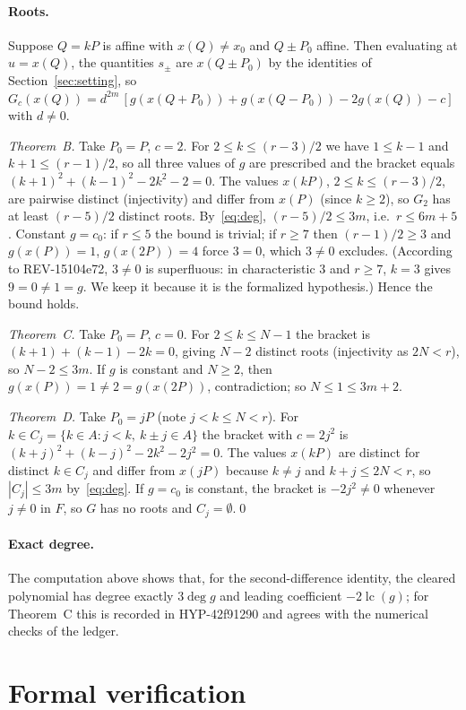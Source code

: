 \documentclass[11pt,a4paper]{article}
\theoremstyle{remark}
\newcommand{\lc}{\operatorname{lc}}
\begin{document}
\paragraph{Roots.} Suppose $Q=kP$ is affine with $x(Q)\ne x_0$ and $Q\pm P_0$ affine. Then evaluating at $u=x(Q)$,
the quantities $s_\pm$ are $x(Q\pm P_0)$ by the identities of Section~\ref{sec:setting}, so
$G_c(x(Q))=d^{2m}\,[g(x(Q+P_0))+g(x(Q-P_0))-2g(x(Q))-c]$ with $d\ne0$.

\emph{Theorem~B.} Take $P_0=P$, $c=2$. For $2\le k\le (r-3)/2$ we have $1\le k-1$ and $k+1\le(r-1)/2$, so all three values of $g$ are
prescribed and the bracket equals $(k+1)^2+(k-1)^2-2k^2-2=0$. The values $x(kP)$, $2\le k\le (r-3)/2$, are pairwise distinct (injectivity) and
differ from $x(P)$ (since $k\ge2$), so $G_2$ has at least $(r-5)/2$ distinct roots. By~\eqref{eq:deg}, $(r-5)/2\le3m$, i.e.\ $r\le6m+5$.
Constant $g=c_0$: if $r\le5$ the bound is trivial; if $r\ge7$ then $(r-1)/2\ge3$ and $g(x(P))=1$, $g(x(2P))=4$ force $3=0$, which $3\ne0$ excludes. (According to \mbox{REV-15104e72}, $3\ne0$ is superfluous: in characteristic $3$ and $r\ge7$, $k=3$ gives $9=0\ne1=g$. We keep it because it is the formalized hypothesis.) Hence the bound holds.

\emph{Theorem~C.} Take $P_0=P$, $c=0$. For $2\le k\le N-1$ the bracket is $(k+1)+(k-1)-2k=0$, giving $N-2$ distinct roots
(injectivity as $2N<r$), so $N-2\le3m$. If $g$ is constant and $N\ge2$, then $g(x(P))=1\neq2=g(x(2P))$, contradiction; so $N\le1\le 3m+2$.

\emph{Theorem~D.} Take $P_0=jP$ (note $j<k\le N<r$). For $k\in C_j=\{k\in A:j<k,\ k\pm j\in A\}$ the bracket with $c=2j^2$ is
$(k+j)^2+(k-j)^2-2k^2-2j^2=0$. The values $x(kP)$ are distinct for distinct $k\in C_j$ and differ from $x(jP)$ because $k\ne j$ and $k+j\le 2N<r$,
so $|C_j|\le3m$ by~\eqref{eq:deg}. If $g=c_0$ is constant, the bracket is $-2j^2\neq 0$ whenever $j\ne0$ in $F$, so $G$ has no roots
and $C_j=\emptyset$.\qed

\paragraph{Exact degree.} The computation above shows that, for the second-difference identity, the cleared polynomial has degree exactly $3\deg g$
and leading coefficient $-2\lc(g)$; for Theorem~C this is recorded in \mbox{HYP-42f91290} and agrees with the numerical checks of the ledger.

\section{Formal verification}\label{sec:lean}
\begingroup\sloppy
\end{document}
